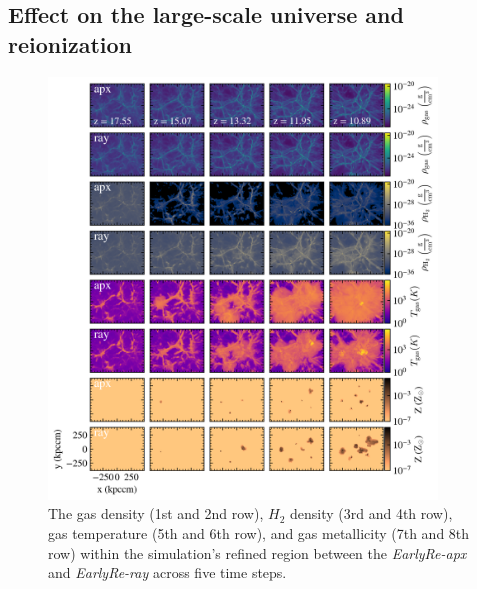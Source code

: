 \documentclass[linenumbers, twocolumn]{aastex631}
\begin{document}
\subsection{Effect on the large-scale universe and reionization}

\begin{figure}
	\centering
	\includegraphics[width=0.92\textwidth]{EarlyRe/gas_surface_density_multiple_ver1088_ver2.png}
	\caption{The gas density (1st and 2nd row), $H_{2}$ density (3rd and 4th row), gas temperature (5th and 6th row), and gas metallicity (7th and 8th row) within the simulation's refined region between the \textit{EarlyRe-apx} and \textit{EarlyRe-ray} across five time steps.}
	\label{fig:gas_surface_density_wholebox}
\end{figure}
\end{document}
